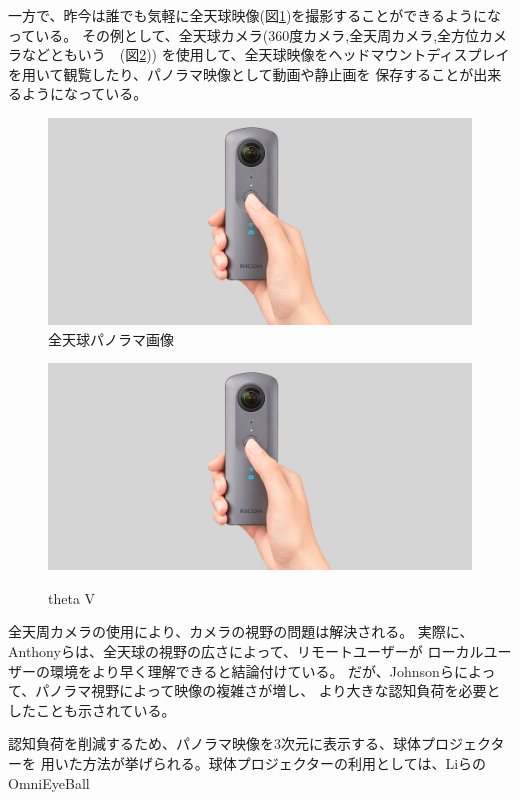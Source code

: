 一方で、昨今は誰でも気軽に全天球映像(図\ref{fig:2})を撮影することができるようになっている。
その例として、全天球カメラ(360度カメラ,全天周カメラ,全方位カメラなどともいう　(図\ref{fig:3}))
を使用して、全天球映像をヘッドマウントディスプレイを用いて観覧したり、パノラマ映像として動画や静止画を
保存することが出来るようになっている。
\begin{figure}[tb]
  \centering
  \includegraphics[scale=0.2]{fig/thetaV.png}
  \caption{全天球パノラマ画像}\label{fig:2}
\end{figure}
\begin{figure}[tb]
  \centering
  \includegraphics[scale=0.2]{fig/thetaV.png}
  \caption{theta V}\label{fig:3}\cite{4}
\end{figure}

全天周カメラの使用により、カメラの視野の問題は解決される。
実際に、Anthonyら\cite{5}は、全天球の視野の広さによって、リモートユーザーが
ローカルユーザーの環境をより早く理解できると結論付けている。
だが、Johnsonら\cite{6}によって、パノラマ視野によって映像の複雑さが増し、
より大きな認知負荷を必要としたことも示されている。

認知負荷を削減するため、パノラマ映像を3次元に表示する、球体プロジェクターを
用いた方法が挙げられる。球体プロジェクターの利用としては、LiらのOmniEyeBall